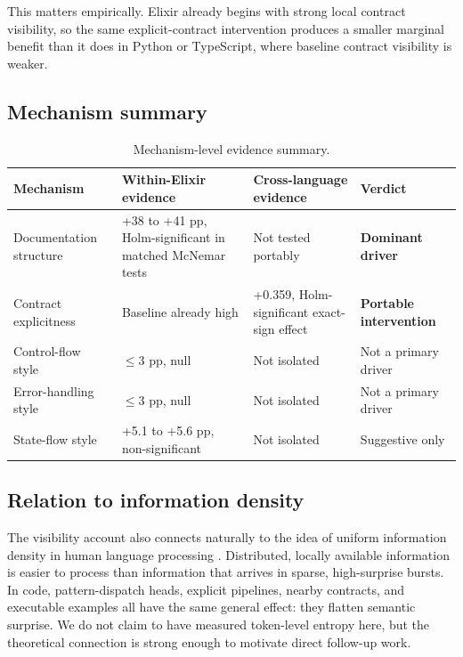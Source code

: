 \documentclass[11pt]{article}
\newcommand{\pp}{pp}
\newcommand{\elixir}{Elixir}
\newcommand{\pythonlang}{Python}
\newcommand{\tslang}{TypeScript}
\begin{document}
This matters empirically. \elixir{} already begins with strong local contract visibility, so the same explicit-contract intervention produces a smaller marginal benefit than it does in \pythonlang{} or \tslang{}, where baseline contract visibility is weaker.

\subsection{Mechanism summary}

\begin{table}[H]
\centering
\caption{Mechanism-level evidence summary.}
\label{tab:mechanisms}
\small
\begin{tabularx}{\textwidth}{>{\raggedright\arraybackslash}p{}
                >{\raggedright\arraybackslash}X
                >{\raggedright\arraybackslash}X
                >{\raggedright\arraybackslash}p{}}
\toprule
Mechanism & Within-Elixir evidence & Cross-language evidence & Verdict \\
\midrule
Documentation structure & +38 to +41 \pp{}, Holm-significant in matched McNemar tests & Not tested portably & \textbf{Dominant driver} \\
Contract explicitness & Baseline already high & +0.359, Holm-significant exact-sign effect & \textbf{Portable intervention} \\
Control-flow style & $\leq 3$ \pp{}, null & Not isolated & Not a primary driver \\
Error-handling style & $\leq 3$ \pp{}, null & Not isolated & Not a primary driver \\
State-flow style & +5.1 to +5.6 \pp{}, non-significant & Not isolated & Suggestive only \\
\bottomrule
\end{tabularx}
\end{table}

\subsection{Relation to information density}

The visibility account also connects naturally to the idea of uniform information density in human language processing \cite{jaeger2010}. Distributed, locally available information is easier to process than information that arrives in sparse, high-surprise bursts. In code, pattern-dispatch heads, explicit pipelines, nearby contracts, and executable examples all have the same general effect: they flatten semantic surprise. We do not claim to have measured token-level entropy here, but the theoretical connection is strong enough to motivate direct follow-up work.
\end{document}
